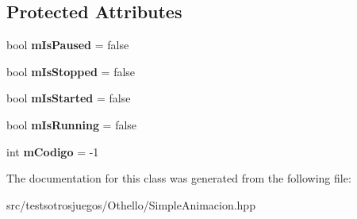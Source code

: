 \subsection*{Protected Attributes}
\begin{DoxyCompactItemize}
\item 
bool {\bfseries m\+Is\+Paused} = false\hypertarget{class_simple_animacion_a0482653701749a07d87346e10b7313f3}{}\label{class_simple_animacion_a0482653701749a07d87346e10b7313f3}

\item 
bool {\bfseries m\+Is\+Stopped} = false\hypertarget{class_simple_animacion_adb1ab77c997a9117973640457e5dbc05}{}\label{class_simple_animacion_adb1ab77c997a9117973640457e5dbc05}

\item 
bool {\bfseries m\+Is\+Started} = false\hypertarget{class_simple_animacion_a5922d311e66d3d5042d3efb0198a7ed3}{}\label{class_simple_animacion_a5922d311e66d3d5042d3efb0198a7ed3}

\item 
bool {\bfseries m\+Is\+Running} = false\hypertarget{class_simple_animacion_a502bfd3afe76b16b3d93b1db07fd4109}{}\label{class_simple_animacion_a502bfd3afe76b16b3d93b1db07fd4109}

\item 
int {\bfseries m\+Codigo} = -\/1\hypertarget{class_simple_animacion_afb4c76641f54d48157238a9936cec53b}{}\label{class_simple_animacion_afb4c76641f54d48157238a9936cec53b}

\end{DoxyCompactItemize}


The documentation for this class was generated from the following file\+:\begin{DoxyCompactItemize}
\item 
src/testsotrosjuegos/\+Othello/Simple\+Animacion.\+hpp\end{DoxyCompactItemize}
